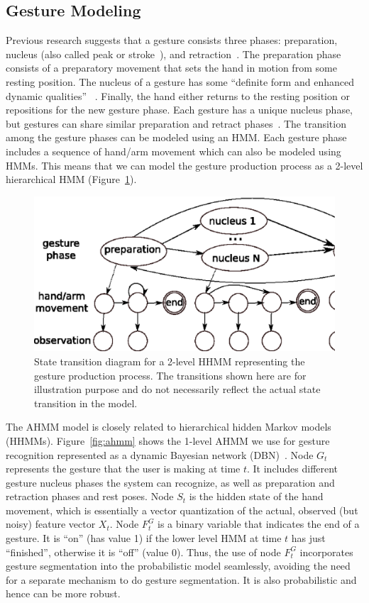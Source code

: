 \documentclass{acm_proc_article-sp}
\begin{document}
\subsection{Gesture Modeling}
Previous research suggests that
a gesture consists three phases: preparation, nucleus 
(also called peak or stroke~\cite{Mcneil82}), and retraction~\cite{Pavlovic97}. The preparation phase consists
of a preparatory movement that sets the hand in motion from some resting position.
The nucleus of a gesture has some ``definite form and enhanced dynamic qualities''
~\cite{kendon86}. Finally, the hand either returns to the resting position or repositions
for the new gesture phase. Each gesture has a unique nucleus phase, but gestures can
share similar preparation and retract phases~\cite{krahnstoever2002}. The transition among the gesture phases can be modeled using an HMM. Each gesture
phase includes a sequence of hand/arm movement which can also be modeled using HMMs. This means
that we can model the gesture production process as a 2-level hierarchical HMM (Figure~\ref{fig:hhmm}).

\begin{figure}
\centering
\includegraphics[width=1\columnwidth]{fig/hhmm.ps}
\caption{State transition diagram for a 2-level HHMM representing the gesture production process.
The transitions shown here are for illustration purpose and do not necessarily reflect the
actual state transition in the model.}
\label{fig:hhmm}
\end{figure}

The AHMM model is closely related to hierarchical hidden Markov models (HHMMs).
Figure~\ref{fig:ahmm} shows the 1-level AHMM we use for gesture recognition 
represented as a dynamic Bayesian network (DBN)~\cite{Pavlovic99}. Node
$G_t$ represents the gesture that the
user is making at time $t$. It includes different gesture nucleus phases the system
can recognize, as well as preparation and retraction phases and rest poses.
Node $S_t$ is the hidden state of the hand movement, which is essentially a
vector quantization of the actual, observed (but noisy) feature vector $X_t$. 
Node $F_t^G$ is a binary variable that indicates the end of a
gesture. It is ``on'' (has value 1) if the lower level HMM at time $t$ has just
``finished'', otherwise it is ``off'' (value 0). Thus, the use of node $F_t^G$
incorporates gesture segmentation into the probabilistic model seamlessly, avoiding
the need for a separate mechanism to do gesture segmentation. It is also probabilistic and hence can be more robust.
\end{document}
